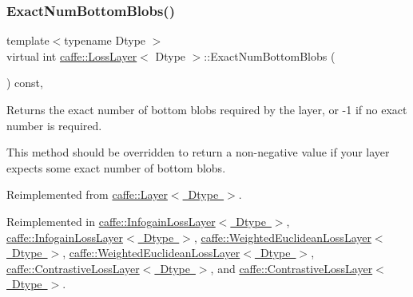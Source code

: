 \subsubsection{\texorpdfstring{Exact\+Num\+Bottom\+Blobs()}{ExactNumBottomBlobs()}\hspace{0.1cm}{\footnotesize\ttfamily [2/2]}}
{\footnotesize\ttfamily template$<$typename Dtype $>$ \\
virtual int \mbox{\hyperlink{classcaffe_1_1_loss_layer}{caffe\+::\+Loss\+Layer}}$<$ Dtype $>$\+::Exact\+Num\+Bottom\+Blobs (\begin{DoxyParamCaption}{ }\end{DoxyParamCaption}) const\hspace{0.3cm}{\ttfamily [inline]}, {\ttfamily [virtual]}}



Returns the exact number of bottom blobs required by the layer, or -\/1 if no exact number is required. 

This method should be overridden to return a non-\/negative value if your layer expects some exact number of bottom blobs. 

Reimplemented from \mbox{\hyperlink{classcaffe_1_1_layer_a8e5ee0494d85f5f55fc4396537cbc60f}{caffe\+::\+Layer$<$ Dtype $>$}}.



Reimplemented in \mbox{\hyperlink{classcaffe_1_1_infogain_loss_layer_aa03732f381764180748479c83b289869}{caffe\+::\+Infogain\+Loss\+Layer$<$ Dtype $>$}}, \mbox{\hyperlink{classcaffe_1_1_infogain_loss_layer_aa03732f381764180748479c83b289869}{caffe\+::\+Infogain\+Loss\+Layer$<$ Dtype $>$}}, \mbox{\hyperlink{classcaffe_1_1_weighted_euclidean_loss_layer_a2ac1ab6f657c6531dee37f80a971bbd9}{caffe\+::\+Weighted\+Euclidean\+Loss\+Layer$<$ Dtype $>$}}, \mbox{\hyperlink{classcaffe_1_1_weighted_euclidean_loss_layer_a2ac1ab6f657c6531dee37f80a971bbd9}{caffe\+::\+Weighted\+Euclidean\+Loss\+Layer$<$ Dtype $>$}}, \mbox{\hyperlink{classcaffe_1_1_contrastive_loss_layer_aa6f3ad6918e64ffa1828e821accf25e9}{caffe\+::\+Contrastive\+Loss\+Layer$<$ Dtype $>$}}, and \mbox{\hyperlink{classcaffe_1_1_contrastive_loss_layer_aa6f3ad6918e64ffa1828e821accf25e9}{caffe\+::\+Contrastive\+Loss\+Layer$<$ Dtype $>$}}.

\mbox{\label{classcaffe_1_1_loss_layer_aa5d5ab714a14082f5343dc9c49025b23}} 
